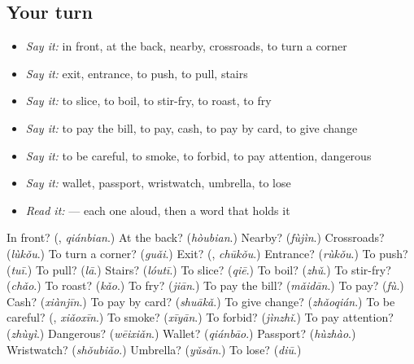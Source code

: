\subsection*{Your turn}
\begin{itemize}
\raggedright
  \item \emph{Say it:} in front, at the back, nearby, crossroads, to turn a corner
  \item \emph{Say it:} exit, entrance, to push, to pull, stairs
  \item \emph{Say it:} to slice, to boil, to stir-fry, to roast, to fry
  \item \emph{Say it:} to pay the bill, to pay, cash, to pay by card, to give change
  \item \emph{Say it:} to be careful, to smoke, to forbid, to pay attention, dangerous
  \item \emph{Say it:} wallet, passport, wristwatch, umbrella, to lose
  \item \emph{Read it:}    — each one aloud, then a word that holds it
\end{itemize}

\begin{tcolorbox}[breakable,colback=teal!4,colframe=teal!35!black,title={Before you move on}]
In front? (\textbf{}, \emph{qiánbian}.) At the back? (\emph{hòubian}.) Nearby? (\emph{fùjìn}.) Crossroads? (\emph{lùkǒu}.) To turn a corner? (\emph{guǎi}.) Exit? (\textbf{}, \emph{chūkǒu}.) Entrance? (\emph{rùkǒu}.) To push? (\emph{tuī}.) To pull? (\emph{lā}.) Stairs? (\emph{lóutī}.) To slice? (\emph{qiē}.) To boil? (\emph{zhǔ}.) To stir-fry? (\emph{chǎo}.) To roast? (\emph{kǎo}.) To fry? (\emph{jiān}.) To pay the bill? (\emph{mǎidān}.) To pay? (\emph{fù}.) Cash? (\emph{xiànjīn}.) To pay by card? (\emph{shuākǎ}.) To give change? (\emph{zhǎoqián}.) To be careful? (\textbf{}, \emph{xiǎoxīn}.) To smoke? (\emph{xīyān}.) To forbid? (\emph{jìnzhǐ}.) To pay attention? (\emph{zhùyì}.) Dangerous? (\emph{wēixiǎn}.) Wallet? (\emph{qiánbāo}.) Passport? (\emph{hùzhào}.) Wristwatch? (\emph{shǒubiǎo}.) Umbrella? (\emph{yǔsǎn}.) To lose? (\emph{diū}.)
\end{tcolorbox}
